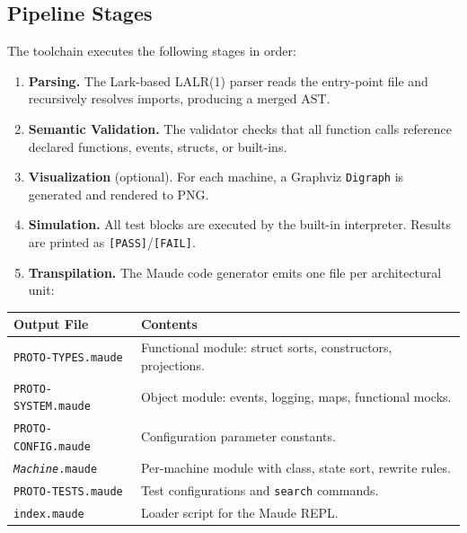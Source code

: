 \documentclass[11pt,letterpaper]{article}
\begin{document}
\subsection{Pipeline Stages}

The toolchain executes the following stages in order:

\begin{enumerate}
  \item \textbf{Parsing.}  The Lark-based LALR(1) parser reads the
        entry-point file and recursively resolves imports, producing a
        merged AST.
  \item \textbf{Semantic Validation.}  The validator checks that all
        function calls reference declared functions, events, structs,
        or built-ins.
  \item \textbf{Visualization} (optional).  For each machine, a
        Graphviz \texttt{Digraph} is generated and rendered to PNG.
  \item \textbf{Simulation.}  All test blocks are executed by the
        built-in interpreter.  Results are printed as
        \texttt{[PASS]}/\texttt{[FAIL]}.
  \item \textbf{Transpilation.}  The Maude code generator emits one
        file per architectural unit:
\end{enumerate}

\begin{center}
\begin{tabular}{@{}ll@{}}
\toprule
\textbf{Output File} & \textbf{Contents} \\
\midrule
\texttt{PROTO-TYPES.maude}  & Functional module: struct sorts,
                               constructors, projections. \\
\texttt{PROTO-SYSTEM.maude} & Object module: events, logging,
                               maps, functional mocks. \\
\texttt{PROTO-CONFIG.maude} & Configuration parameter constants. \\
\texttt{\textit{Machine}.maude} & Per-machine module with class,
                               state sort, rewrite rules. \\
\texttt{PROTO-TESTS.maude}  & Test configurations and
                               \texttt{search} commands. \\
\texttt{index.maude}        & Loader script for the Maude REPL. \\
\bottomrule
\end{tabular}
\end{center}
\end{document}

